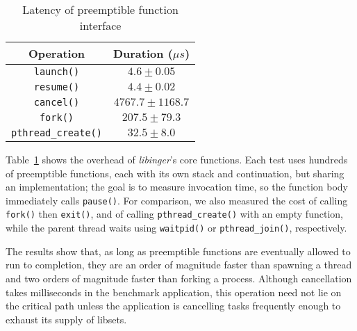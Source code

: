 \begin{table}
\begin{center}
\begin{tabular}{c | c}
Operation & Duration ($\mu{s}$) \\
\hline
\texttt{launch()} & $4.6 \pm 0.05$ \\
\texttt{resume()} & $4.4 \pm 0.02$ \\
\texttt{cancel()} & $4767.7 \pm 1168.7$ \\
\hline
\texttt{fork()} & $207.5 \pm 79.3$ \\
\texttt{pthread\_create()} & $32.5 \pm 8.0$
\end{tabular}
\end{center}
\caption{Latency of preemptible function interface}
\label{tab:libinger}
\end{table}

Table~\ref{tab:libinger} shows the overhead of \textit{libinger}'s core functions.
Each test uses hundreds of preemptible functions, each with its own stack and
continuation, but sharing an implementation; the goal is to measure invocation time,
so the function body immediately calls \texttt{pause()}.
For comparison, we also measured the cost of calling \texttt{fork()} then
\texttt{exit()}, and of calling \texttt{pthread\_create()} with an empty function,
while the parent
thread waits using \texttt{waitpid()} or \texttt{pthread\_join()}, respectively.

The results show that, as long as preemptible functions are eventually allowed to run
to completion, they are an order of magnitude faster than spawning a thread and two
orders of magnitude faster than forking a process.  Although cancellation takes
milliseconds in the benchmark application, this operation need not lie on the
critical path unless the application is cancelling tasks frequently enough to exhaust
its supply of libsets.
